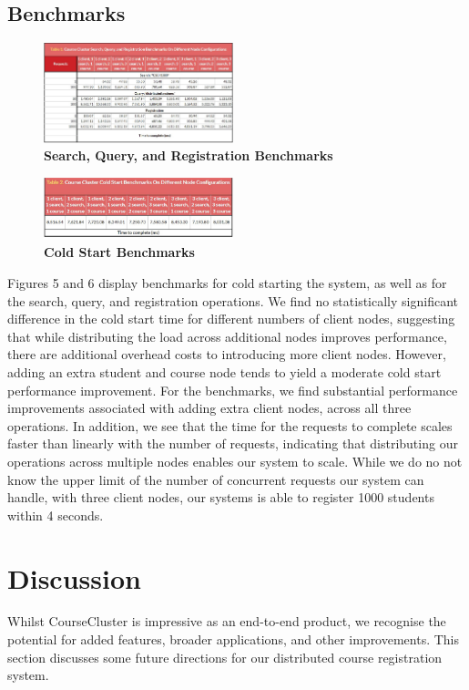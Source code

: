 \documentclass[sigplan, screen, 10pt]{acmart}
\begin{document}
\subsection{Benchmarks}
\begin{figure}[!htb]
  \centering
  \includegraphics[width=0.49\textwidth]{./figs/nodeconfigurations.png}
  \caption{
    \textbf{Search, Query, and Registration Benchmarks}
  }
\end{figure}
\begin{figure}[!htb]
  \centering
  \includegraphics[width=0.49\textwidth]{./figs/coldstart.png}
  \caption{
    \textbf{Cold Start Benchmarks}
  }
\end{figure}
Figures 5 and 6 display benchmarks for cold starting the system, as well as for the search, query, and registration operations. We find no statistically significant difference in the cold start time for different numbers of client nodes, suggesting that while distributing the load across additional nodes improves performance, there are additional overhead costs to introducing more client nodes. However, adding an extra student and course node tends to yield a moderate cold start performance improvement. For the benchmarks, we find substantial performance improvements associated with adding extra client nodes, across all three operations. In addition, we see that the time for the requests to complete scales faster than linearly with the number of requests, indicating that distributing our operations across multiple nodes enables our system to scale. While we do no not know the upper limit of the number of concurrent requests our system can handle, with three client nodes, our systems is able to register 1000 students within 4 seconds.

\section{Discussion}
Whilst CourseCluster is impressive as an end-to-end product, we recognise the potential for added features, broader applications, and other improvements. This section discusses some future directions for our distributed course registration system.
\end{document}
